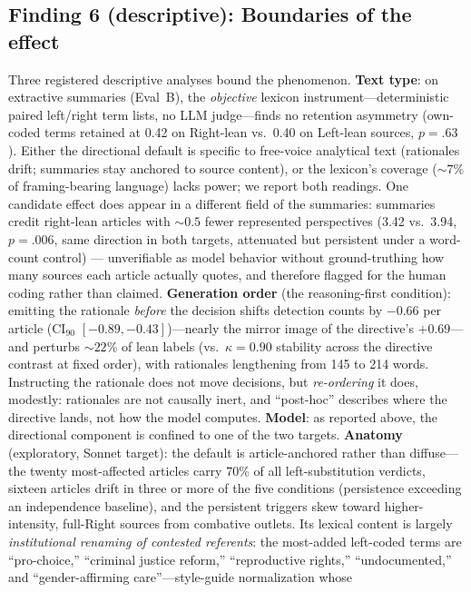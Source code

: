 \documentclass{article}
\newcommand{\kap}{\kappa}
\begin{document}
\subsection{Finding 6 (descriptive): Boundaries of the effect}
Three registered descriptive analyses bound the phenomenon.
\textbf{Text type}: on extractive summaries (Eval~B), the
\emph{objective} lexicon instrument---deterministic paired left/right
term lists, no LLM judge---finds no retention asymmetry (own-coded terms
retained at 0.42 on Right-lean vs.\ 0.40 on Left-lean sources, $p=.63$).
Either the directional default is specific to free-voice analytical text
(rationales drift; summaries stay anchored to source content), or the
lexicon's coverage (${\sim}7\%$ of framing-bearing language) lacks power;
we report both readings. One candidate effect does appear in a
different field of the summaries: summaries credit right-lean articles with ${\sim}0.5$
fewer represented perspectives (3.42 vs.\ 3.94, $p=.006$, same direction
in both targets, attenuated but persistent under a word-count control)
--- unverifiable as model behavior without ground-truthing how many
sources each article actually quotes, and therefore flagged for the human
coding rather than claimed. \textbf{Generation order} (the reasoning-first condition): emitting
the rationale \emph{before} the decision shifts detection counts by
$-0.66$ per article (CI$_{90}$ $[-0.89, -0.43]$)---nearly the mirror
image of the directive's $+0.69$---and perturbs ${\sim}22\%$ of lean labels
(vs.\ $\kap = 0.90$ stability across the directive contrast at fixed
order), with rationales lengthening from 145 to 214 words. Instructing
the rationale does not move decisions, but \emph{re-ordering} it
does, modestly: rationales are not causally inert, and
``post-hoc'' describes where the directive lands, not how the model
computes. \textbf{Model}: as reported above, the
directional component is confined to one of the two targets.
\textbf{Anatomy} (exploratory, Sonnet target): the default is
article-anchored rather than diffuse---the twenty most-affected articles
carry 70\% of all left-substitution verdicts, sixteen articles drift in
three or more of the five conditions (persistence exceeding an
independence baseline), and the persistent triggers skew toward
higher-intensity, full-Right sources from combative outlets. Its
lexical content is largely \emph{institutional renaming of contested
referents}: the most-added left-coded terms are ``pro-choice,''
``criminal justice reform,'' ``reproductive rights,'' ``undocumented,''
and ``gender-affirming care''---style-guide normalization whose
\end{document}
